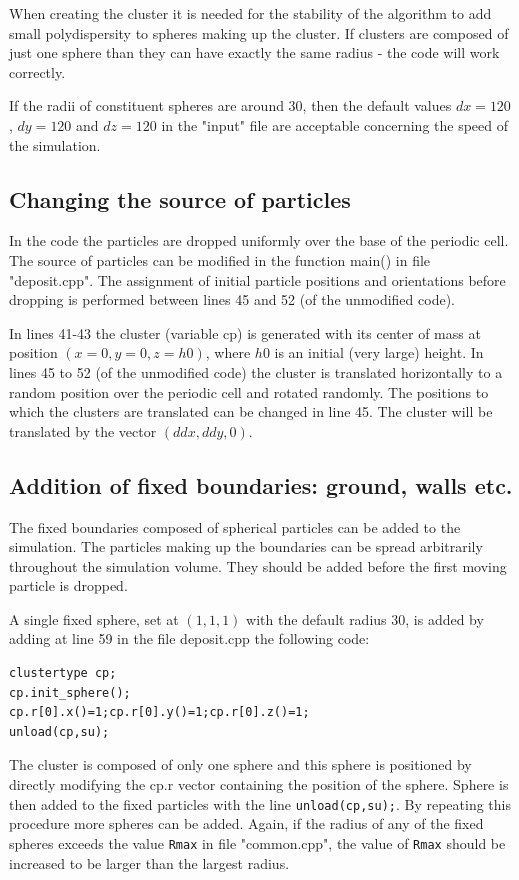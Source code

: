 \documentclass[12pt]{article}
\begin{document}
When creating the cluster it is needed for the stability of the algorithm to add small polydispersity to spheres making up the cluster. If clusters are composed of just one sphere than they can have exactly the same radius - the code will work correctly.

If the radii of constituent spheres are around 30, then the default values $dx=120$, $dy=120$ and $dz=120$ in the "input" file are acceptable concerning the speed of the simulation.

\subsection{Changing the source of particles}
In the code the particles are dropped uniformly over the base of the periodic cell. The source of particles can be modified in the function main() in file "deposit.cpp". The assignment of initial particle positions and orientations before dropping is performed between lines 45 and 52 (of the unmodified code). 

In lines 41-43 the cluster (variable cp) is generated with its center of mass at position $(x=0,y=0,z=h0)$, where $h0$ is an initial (very large) height. In lines 45 to 52 (of the unmodified code) the cluster is translated horizontally to a random position over the periodic cell and rotated randomly. The positions to which the clusters are translated can be changed in line 45. The cluster will be translated by the vector $(ddx,ddy,0)$.

\subsection{Addition of fixed boundaries: ground, walls etc.}
The fixed boundaries composed of spherical particles can be added to the simulation. The particles making up the boundaries can be spread arbitrarily throughout the simulation volume. They should be added before the first moving particle is dropped. 

A single fixed sphere, set at $(1,1,1)$ with the default radius 30, is added by adding at line 59 in the file deposit.cpp the following code:
\begin{verbatim}
clustertype cp;
cp.init_sphere();
cp.r[0].x()=1;cp.r[0].y()=1;cp.r[0].z()=1;
unload(cp,su);
\end{verbatim}  
The cluster is composed of only one sphere and this sphere is positioned by directly modifying the cp.r vector containing the position of the sphere. Sphere is then added to the fixed particles with the line \texttt{unload(cp,su);}. By repeating this procedure more spheres can be added. Again, if the radius of any of the fixed spheres exceeds the value \texttt{Rmax} in file "common.cpp", the value of \texttt{Rmax} should be increased to be larger than the largest radius.
\end{document}
